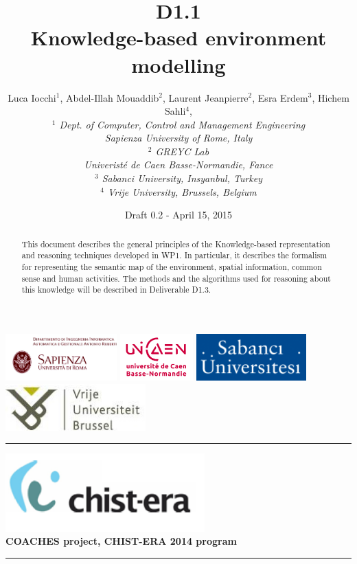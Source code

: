 \documentclass{article}
\title{D1.1\\ 
Knowledge-based environment modelling}
\author{Luca Iocchi$^1$, Abdel-Illah Mouaddib$^2$,  Laurent Jeanpierre$^2$, Esra Erdem$^3$, Hichem Sahli$^4$,  \\
\textit{
$^1$ Dept. of Computer, Control and Management Engineering\\
Sapienza University of Rome, Italy\\
$^2$ GREYC Lab\\
Univeristé de Caen Basse-Normandie, Fance\\
$^3$ Sabanci University, Insyanbul, Turkey\\
$^4$ Vrije University, Brussels, Belgium}}
\date{Draft 0.2 - April 15, 2015}
\newcommand{\makemadtitle}{
  \hrule
  \vspace{.5em}
  \noindent
  \begin{center}
  \textbf{
  {\centering\includegraphics[height=3cm]{../fig/logoCHISTERA2014.png}}\\
   {\centering\Large COACHES project, CHIST-ERA 2014 program}
  }
  \end{center}
  \vspace{.5em}
 
  \hrule
  \vspace{3em}
  \begin{center}
    \begin{Large}\textbf{\usebox{\notetitle}}\end{Large}\\[2em]
    \begin{large}\usebox{\noteauthor}\\ [2em] 
    \usebox{\notedate}\end{large}
  \end{center}
  \vspace{3em}
}
\begin{document}
\includegraphics[height=1.8cm]{../fig/logoSapienza.png}
\includegraphics[height=1.8cm]{../fig/logoUNICAEN.jpg}
\includegraphics[height=1.8cm]{../fig/logoSebanci}
\includegraphics[height=1.8cm]{../fig/logoVUB}

\vspace{0.5cm}

\makemadtitle

\begin{abstract}
This document describes the general principles of the Knowledge-based representation and reasoning techniques developed in WP1. In particular, it describes the formalism for representing the semantic map of the environment, spatial information, common sense and human activities.
The methods and the algorithms used for reasoning about this knowledge will be described in Deliverable D1.3.
\end{abstract}

\vspace*{1.5cm}

\newpage
\end{document}
